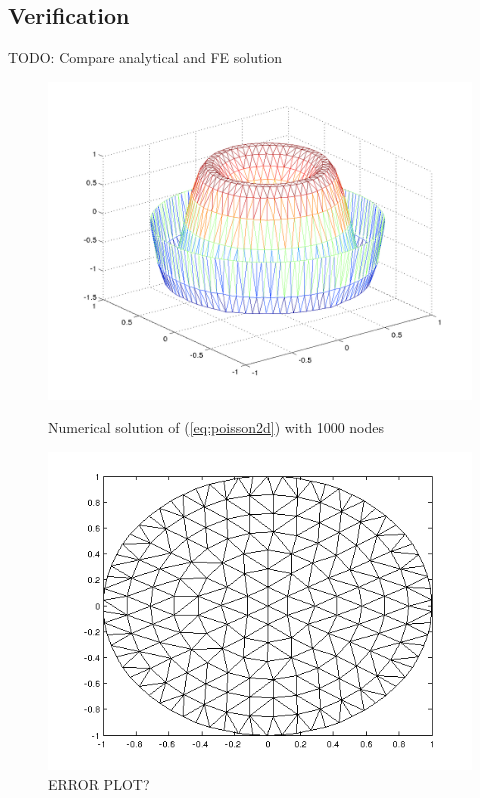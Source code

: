 \documentclass[paper=a4, fontsize=11pt]{scrartcl} %
\begin{document}
\subsection{Verification}
TODO: Compare analytical and FE solution
\begin{figure}[!htb]
  \includegraphics[width=\linewidth]{2h1000.png}
  \caption{Numerical solution of (\ref{eq:poisson2d}) with 1000 nodes}\label{fig:2h1000}
\endminipage\hfill
{}
  \includegraphics[width=\linewidth]{2d200.png}
  \caption{ERROR PLOT?}\label{fig:2d200}
\endminipage\hfill
\end{figure}
\end{document}

